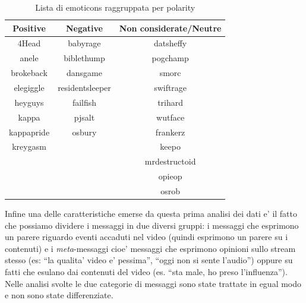 \documentclass[a4paper,12pt,openright,twoside]{report}
\theoremstyle{definition}
\begin{document}
\begin{table}[h]
\begin{center}
\begin{tabular}{|c|c|c|}
\hline
Positive & Negative & Non considerate/Neutre \\
\hline
4Head & babyrage & datsheffy \\
\hline
anele &  biblethump &  pogchamp \\
\hline
brokeback &  dansgame & smorc \\
\hline
elegiggle & residentsleeper &  swiftrage \\
\hline
heyguys & failfish & trihard \\
\hline
kappa & pjsalt & wutface \\
\hline
kappapride & osbury & frankerz \\
\hline
kreygasm &  & keepo \\
\hline
 & & mrdestructoid \\
\hline
& & opieop \\
\hline
& & osrob \\
\hline
\end{tabular}
\end{center}
\caption{Lista di emoticons raggruppata per polarity}
\label{tab:emoticons2}
\end{table}

Infine una delle caratteristiche emerse da questa prima analisi dei dati e' il fatto che possiamo dividere i messaggi in due diversi gruppi: i messaggi che esprimono un parere
riguardo eventi accaduti nel video (quindi esprimono un parere su i contenuti) e i \emph{meta}-messaggi cioe' messaggi che esprimono opinioni sullo stream stesso (es: ``la qualita' video
e' pessima'', ``oggi non si sente l'audio'') oppure su fatti che esulano dai contenuti del video (es. ``sta male, ho preso l'influenza''). Nelle analisi svolte le due categorie
di messaggi sono state trattate in egual modo e non sono state differenziate.
  
\end{document}
